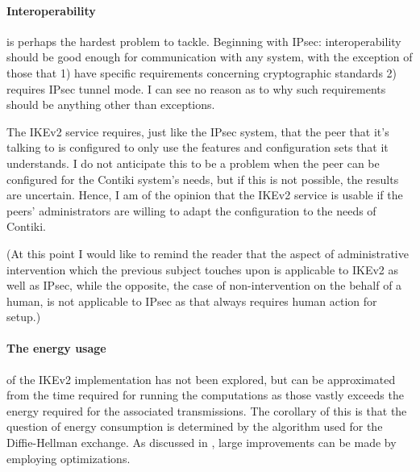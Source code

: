 \documentclass[final,a4paper,twoside,11pt,onecolumn]{report}
\begin{document}
\paragraph{Interoperability} is perhaps the hardest problem to tackle. Beginning with IPsec: interoperability should be good enough for communication with any system, with the exception of those that 1) have specific requirements concerning cryptographic standards 2) requires IPsec tunnel mode. I can see no reason as to why such requirements should be anything other than exceptions.

The IKEv2 service requires, just like the IPsec system, that the peer that it's talking to is configured to only use the features and configuration sets that it understands. I do not anticipate this to be a problem when the peer can be configured for the Contiki system's needs, but if this is not possible, the results are uncertain. Hence, I am of the opinion that the IKEv2 service is usable if the peers' administrators are willing to adapt the configuration to the needs of Contiki.

(At this point I would like to remind the reader that the aspect of administrative intervention which the previous subject touches upon is applicable to IKEv2 as well as IPsec, while the opposite, the case of non-intervention on the behalf of a human, is not applicable to IPsec as that always requires human action for setup.)



\paragraph{The energy usage} of the IKEv2 implementation has not been explored, but can be approximated from the time required for running the computations as those vastly exceeds the energy required for the associated transmissions. The corollary of this is that the question of energy consumption is determined by the algorithm used for the Diffie-Hellman exchange. As discussed in , large improvements can be made by employing optimizations.
\end{document}
